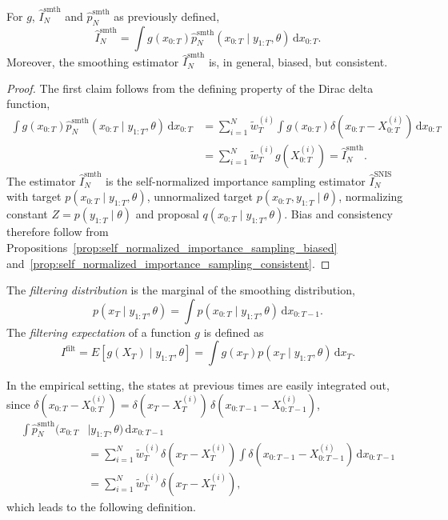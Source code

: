 \begin{proposition}
    \label{prop:smoothing_estimator}
    For $g$, $\hat{I}_N^{\mathrm{smth}}$ and $\hat{p}_N^{\mathrm{smth}}$ as previously defined,
    \begin{equation}
        \hat{I}_N^{\mathrm{smth}} = \int g(x_{0:T}) \hat{p}_N^{\mathrm{smth}}(x_{0:T}\mid y_{1:T},\theta)\,\mathrm{d}x_{0:T}.
    \end{equation}
    Moreover, the smoothing estimator $\hat{I}_N^{\mathrm{smth}}$ is, in general, biased, but consistent.
\end{proposition}
\begin{proof}
    The first claim follows from the defining property of the Dirac delta function,
    \begin{align}
        \int g(x_{0:T}) \hat{p}_N^{\mathrm{smth}}(x_{0:T}\mid y_{1:T},\theta)\,\mathrm{d}x_{0:T} &= \sum_{i=1}^{N} \tilde{w}_T^{(i)} \int g(x_{0:T}) \delta(x_{0:T}-X_{0:T}^{(i)})\,\mathrm{d}x_{0:T} \\
        &= \sum_{i=1}^{N} \tilde{w}_T^{(i)} g(X_{0:T}^{(i)}) = \hat{I}_N^{\mathrm{smth}}.
    \end{align}
    The estimator $\hat{I}_N^{\mathrm{smth}}$ is the self-normalized importance sampling estimator $\hat{I}_N^{\mathrm{SNIS}}$ with target $p(x_{0:T}\mid y_{1:T},\theta)$, unnormalized target $p(x_{0:T},y_{1:T}\mid\theta)$, normalizing constant $Z = p(y_{1:T}\mid\theta)$ and proposal $q(x_{0:T}\mid y_{1:T},\theta)$. 
    Bias and consistency therefore follow from Propositions~\ref{prop:self_normalized_importance_sampling_biased} and~\ref{prop:self_normalized_importance_sampling_consistent}.
\end{proof}

\begin{definition}
    The \emph{filtering distribution} is the marginal of the smoothing distribution,
    \begin{equation}
        p(x_T \mid y_{1:T},\theta) = \int p(x_{0:T} \mid y_{1:T},\theta) \,\mathrm{d}x_{0:T-1}.
    \end{equation}
    The \emph{filtering expectation} of a function $g$ is defined as
    \begin{equation}
        I^{\mathrm{filt}} = E\left[g(X_T) \mid y_{1:T},\theta\right] = \int g(x_T)p(x_T \mid y_{1:T},\theta)\,\mathrm{d}x_T.
    \end{equation}
\end{definition}

In the empirical setting, the states at previous times are easily integrated out, since $\delta(x_{0:T}-X_{0:T}^{(i)}) = \delta(x_T-X_T^{(i)})\,\delta(x_{0:T-1}-X_{0:T-1}^{(i)})$,
\begin{align}
    \int \hat{p}_N^{\mathrm{smth}}(x_{0:T} &\mid y_{1:T}, \theta) \,\mathrm{d}x_{0:T-1} \\
    &= \sum_{i=1}^{N} \tilde{w}_T^{(i)} \delta(x_T-X_T^{(i)}) \int \delta(x_{0:T-1}-X_{0:T-1}^{(i)}) \,\mathrm{d}x_{0:T-1} \\
    &= \sum_{i=1}^{N} \tilde{w}_T^{(i)} \delta(x_T-X_T^{(i)}),
\end{align}
which leads to the following definition.

